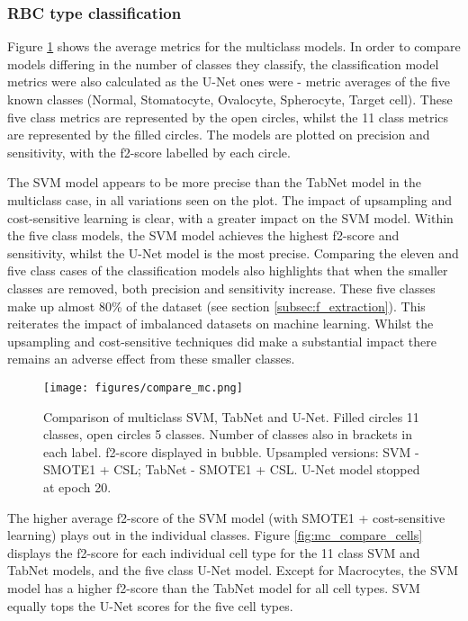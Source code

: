 \documentclass[final,5p,times,twocolumn,authoryear]{elsarticle}
\begin{document}
\subsubsection{RBC type classification}
\label{subsec:comparison11}

Figure \ref{fig:mc_compare} shows the average metrics for the multiclass models. In order to compare models differing in the number of classes they classify, the classification model metrics were also calculated as the U-Net ones were - metric averages of the five known classes (Normal, Stomatocyte, Ovalocyte, Spherocyte, Target cell). These five class metrics are represented by the open circles, whilst the 11 class metrics are represented by the filled circles. The models are plotted on precision and sensitivity, with the f2-score labelled by each circle. 

The SVM model appears to be more precise than the TabNet model in the multiclass case, in all variations seen on the plot. The impact of upsampling and cost-sensitive learning is clear, with a greater impact on the SVM model. Within the five class models, the SVM model achieves the highest f2-score and sensitivity, whilst the U-Net model is the most precise. Comparing the eleven and five class cases of the classification models also highlights that when the smaller classes are removed, both precision and sensitivity increase. These five classes make up almost 80\% of the dataset (see section \ref{subsec:f_extraction}). This reiterates the impact of imbalanced datasets on machine learning. Whilst the upsampling and cost-sensitive techniques did make a substantial impact there remains an adverse effect from these smaller classes.


\begin{figure}[t!]
	\centering
	\texttt{[image: figures/compare\_mc.png]}
	\caption[Comparison of multiclass model metrics]{Comparison of multiclass SVM, TabNet and U-Net. Filled circles 11 classes, open circles 5 classes. Number of classes also in brackets in each label.	f2-score displayed in bubble. Upsampled versions: SVM - SMOTE1 + CSL; TabNet - SMOTE1 + CSL. U-Net model stopped at epoch 20.}
	\label{fig:mc_compare}
\end{figure}

The higher average f2-score of the SVM model (with SMOTE1 + cost-sensitive learning) plays out in the individual classes. Figure \ref{fig:mc_compare_cells} displays the f2-score for each individual cell type for the 11 class SVM and TabNet models, and the five class U-Net model. Except for Macrocytes, the SVM model has a higher f2-score than the TabNet model for all cell types. SVM equally tops the U-Net scores for the five cell types.
\end{document}
